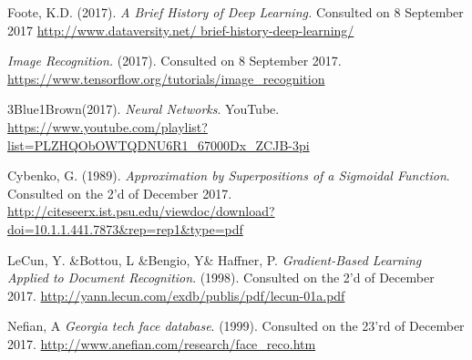 \documentclass[12pt, titlepage]{article}
\begin{document}
\begin{thebibliography}{99}
			Foote, K.D. (2017). \textit{A Brief History of Deep Learning.} Consulted on 8 September 2017
			\href{http://www.dataversity.net/brief-history-deep-learning/}{http://www.dataversity.net/				brief-history-deep-learning/}
			
			\textit{Image Recognition.} (2017). Consulted on 8 September 2017.
			\url{https://www.tensorflow.org/tutorials/image_recognition}
			
			3Blue1Brown(2017). \textit{Neural Networks}. YouTube.
			\url{https://www.youtube.com/playlist?list=PLZHQObOWTQDNU6R1_67000Dx_ZCJB-3pi}
			
			Cybenko, G. (1989). \textit{Approximation by Superpositions of a Sigmoidal Function}. 					Consulted on the 2'd of December 2017.
			\url{http://citeseerx.ist.psu.edu/viewdoc/download?doi=10.1.1.441.7873\&rep=rep1\&type=pdf}
			
			LeCun, Y. \&Bottou, L \&Bengio, Y\& Haffner, P. \textit{Gradient-Based Learning Applied to 				Document Recognition}. (1998). Consulted on the 2'd of December 2017.
			\url{http://yann.lecun.com/exdb/publis/pdf/lecun-01a.pdf}
		
		Nefian, A
		\textit{Georgia tech face database}. (1999). Consulted on the 23'rd of December 2017.
		\url{http://www.anefian.com/research/face_reco.htm}
	\end{thebibliography}
	
\end{document}
